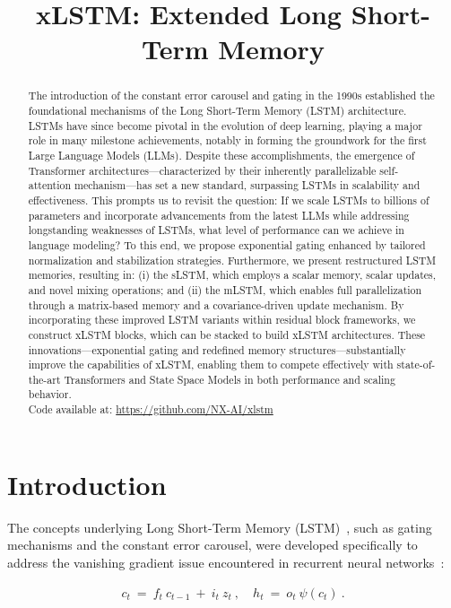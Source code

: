 \title{xLSTM: Extended Long Short-Term Memory}

\begin{abstract}
The introduction of the constant error carousel and gating in the 1990s established the foundational mechanisms of the Long Short-Term Memory (LSTM) architecture. LSTMs have since become pivotal in the evolution of deep learning, playing a major role in many milestone achievements, notably in forming the groundwork for the first Large Language Models (LLMs). Despite these accomplishments, the emergence of Transformer architectures—characterized by their inherently parallelizable self-attention mechanism—has set a new standard, surpassing LSTMs in scalability and effectiveness. This prompts us to revisit the question: If we scale LSTMs to billions of parameters and incorporate advancements from the latest LLMs while addressing longstanding weaknesses of LSTMs, what level of performance can we achieve in language modeling? To this end, we propose exponential gating enhanced by tailored normalization and stabilization strategies. Furthermore, we present restructured LSTM memories, resulting in: (i) the sLSTM, which employs a scalar memory, scalar updates, and novel mixing operations; and (ii) the mLSTM, which enables full parallelization through a matrix-based memory and a covariance-driven update mechanism. By incorporating these improved LSTM variants within residual block frameworks, we construct xLSTM blocks, which can be stacked to build xLSTM architectures. These innovations—exponential gating and redefined memory structures—substantially improve the capabilities of xLSTM, enabling them to compete effectively with state-of-the-art Transformers and State Space Models in both performance and scaling behavior.\\
Code available at: \url{https://github.com/NX-AI/xlstm}
\end{abstract}

\section{Introduction}
\label{sec:intro}

The concepts underlying Long Short-Term Memory (LSTM)~\citep{Hochreiter:91,Hochreiter:97nips,Hochreiter:97}, such as gating mechanisms and the constant error carousel, were developed specifically to address the vanishing gradient issue encountered in recurrent neural networks~\citep{Hochreiter:91,Hochreiter:00book}:

\begin{align}
\label{eq:lstm_idea}
  c_t \ = \ f_t \ c_{t-1} \ + \ 
          i_t \  z_t \ , \quad  
          h_t \ = \ o_t \ \psi({c_t}) \ . 
\end{align}

